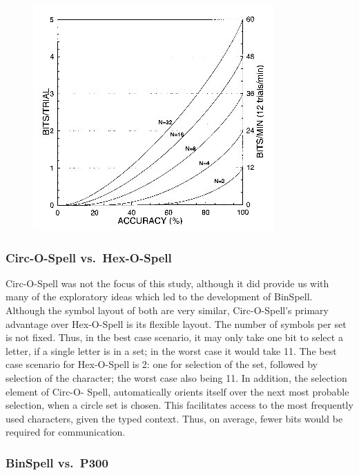 \documentclass[12pt,titlepage]{article}
\begin{document}
\begin{figure}[h]
\begin{center}
	\includegraphics[scale=0.40]{fig12.jpg}
	\label{fig:itrvsacc}
\end{center}
\end{figure}

\subsubsection{Circ-O-Spell vs.\ Hex-O-Spell}

Circ-O-Spell was not the focus of this study, although it did provide us with many of the exploratory ideas which led to the development of BinSpell.  Although the symbol layout of both are very similar, Circ-O-Spell's primary advantage over Hex-O-Spell is its flexible layout.  The number of 
symbols per set is not fixed.  Thus, in the best case scenario, it may only take one bit to select a 
letter, if a single letter is in a set; in the worst case it would take 11.  The best case scenario for Hex-O-Spell is 2: one for selection 
of the set, followed by selection of the character; the worst case also being 11.  In addition, the selection element of Circ-O- 
Spell, automatically orients itself over the next most probable selection, when a circle set is chosen.  This facilitates access to the most frequently used 
characters, given the typed context.  Thus, on average, fewer bits would be required for 
communication.

\subsubsection{BinSpell vs.\ P300}
\end{document}
